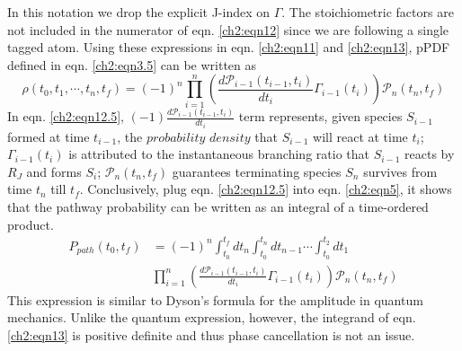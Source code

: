 In this notation we drop the explicit J-index on $\Gamma$. The stoichiometric factors are not
included in the numerator of eqn. \ref{ch2:eqn12} since we are following a single tagged
atom. Using these expressions in eqn. \ref{ch2:eqn11} and \ref{ch2:eqn13}, pPDF defined in eqn. \ref{ch2:eqn3.5} can be written as 
\begin{equation}
\label{ch2:eqn12.5}
\rho(t_0, t_1, \cdots, t_n, t_f) = (-1)^n \prod_{i=1}^{n}{\left( \frac{d\mathcal{P}_{i-1}(t_{i-1},t_i)}{dt_i} \Gamma_{i-1}(t_i) \right) \mathcal{P}_{n}(t_n,t_f)}
\end{equation}
In eqn. \ref{ch2:eqn12.5}, $(-1)\frac{d\mathcal{P}_{i-1}(t_{i-1},t_i)}{dt_i}$ term represents, given species $S_{i-1}$ formed at time $t_{i-1}$, the $probability$ $density$ that $S_{i-1}$ will react at time $t_i$; $\Gamma_{i-1}(t_i)$ is attributed to the instantaneous branching ratio that $S_{i-1}$ reacts by $R_J$ and forms $S_i$; $\mathcal{P}_{n}(t_n,t_f)$ guarantees terminating species $S_n$ survives from time $t_n$ till $t_f$. Conclusively, plug eqn. \ref{ch2:eqn12.5} into eqn. \ref{ch2:eqn5}, it shows that the pathway probability can be
written as an integral of a time-ordered product.\cite{ch1_IRPC_16_ch3_6_ch4_8_bai2014sum,ch1_IRPC_17_ch4_9_bai2015sum}
\begin{equation}
\label{ch2:eqn13}
\begin{split}
P_{path}(t_0,t_f)&= (-1)^n \int_{t_0}^{t_f}{dt_n \int_{t_0}^{t_n}{dt_{n-1} \cdots }} \int_{t_0}^{t_2}{dt_1} \\
&  \prod_{i=1}^{n}{\left( \frac{d\mathcal{P}_{i-1}(t_{i-1},t_i)}{dt_i} \Gamma_{i-1}(t_i) \right) \mathcal{P}_{n}(t_n,t_f)}
\end{split}
\end{equation}
This expression is similar to Dyson’s formula for the amplitude in quantum mechanics.\cite{ch1_IRPC_38_schulmann1996techniques,ch1_IRPC_39_mjolsness2013time} Unlike the quantum expression, however, the integrand of eqn. \ref{ch2:eqn13} is positive definite and thus phase cancellation is not an issue.
\newline
